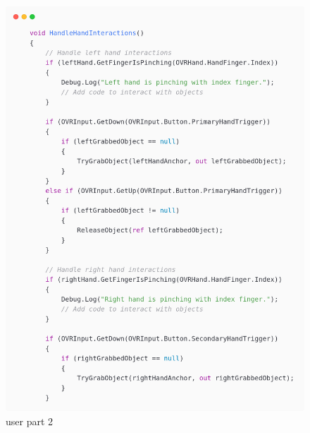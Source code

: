 \begin{figure}[h] 
	\centering
	\includegraphics[width=1\textwidth, height=0.7\textheight]{Images/playerp2.png}
	\caption{user part 2}
	\label{fig:Hands Washing}
\end{figure}


